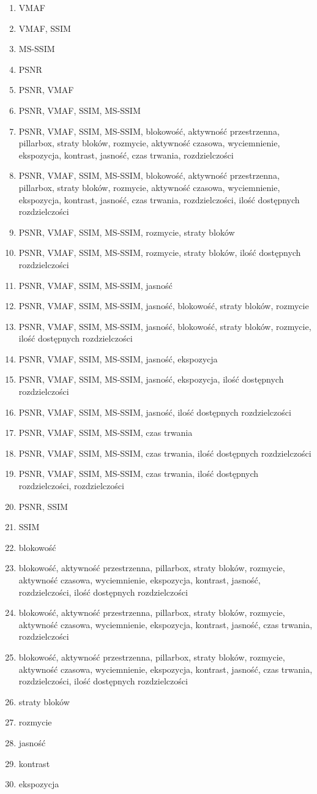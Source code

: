 \begin{enumerate}
\itemsep-0.5em 
\item VMAF
\item VMAF, SSIM
\item MS-SSIM
\item PSNR
\item PSNR, VMAF
\item PSNR, VMAF, SSIM, MS-SSIM
\item PSNR, VMAF, SSIM, MS-SSIM, blokowość, aktywność przestrzenna, pillarbox, straty bloków, rozmycie, aktywność czasowa, wyciemnienie, ekspozycja, kontrast, jasność, czas trwania, rozdzielczości
\item PSNR, VMAF, SSIM, MS-SSIM, blokowość, aktywność przestrzenna, pillarbox, straty bloków, rozmycie, aktywność czasowa, wyciemnienie, ekspozycja, kontrast, jasność, czas trwania, rozdzielczości, ilość dostępnych rozdzielczości
\item PSNR, VMAF, SSIM, MS-SSIM, rozmycie, straty bloków
\item PSNR, VMAF, SSIM, MS-SSIM, rozmycie, straty bloków, ilość dostępnych rozdzielczości
\item PSNR, VMAF, SSIM, MS-SSIM, jasność
\item PSNR, VMAF, SSIM, MS-SSIM, jasność, blokowość, straty bloków, rozmycie
\item PSNR, VMAF, SSIM, MS-SSIM, jasność, blokowość, straty bloków, rozmycie, ilość dostępnych rozdzielczości
\item PSNR, VMAF, SSIM, MS-SSIM, jasność, ekspozycja
\item PSNR, VMAF, SSIM, MS-SSIM, jasność, ekspozycja, ilość dostępnych rozdzielczości
\item PSNR, VMAF, SSIM, MS-SSIM, jasność, ilość dostępnych rozdzielczości
\item PSNR, VMAF, SSIM, MS-SSIM, czas trwania
\item PSNR, VMAF, SSIM, MS-SSIM, czas trwania, ilość dostępnych rozdzielczości
\item PSNR, VMAF, SSIM, MS-SSIM, czas trwania, ilość dostępnych rozdzielczości, rozdzielczości
\item PSNR, SSIM
\item SSIM
\item blokowość
\item blokowość, aktywność przestrzenna, pillarbox, straty bloków, rozmycie, aktywność czasowa, wyciemnienie, ekspozycja, kontrast, jasność, rozdzielczości, ilość dostępnych rozdzielczości
\item blokowość, aktywność przestrzenna, pillarbox, straty bloków, rozmycie, aktywność czasowa, wyciemnienie, ekspozycja, kontrast, jasność, czas trwania, rozdzielczości
\item blokowość, aktywność przestrzenna, pillarbox, straty bloków, rozmycie, aktywność czasowa, wyciemnienie, ekspozycja, kontrast, jasność, czas trwania, rozdzielczości, ilość dostępnych rozdzielczości
\item straty bloków
\item rozmycie
\item jasność
\item kontrast
\item ekspozycja
\end{enumerate}

